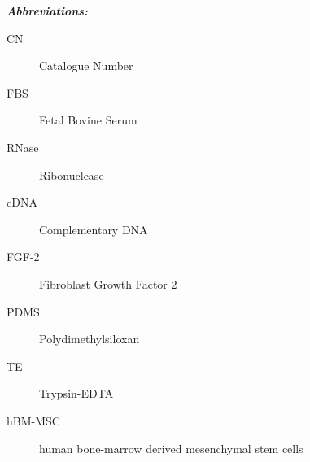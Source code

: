 \textit{\textbf{Abbreviations:}}
\begin{description}
\item[CN] Catalogue Number
\item[FBS] Fetal Bovine Serum
\item[RNase] Ribonuclease
\item[cDNA] Complementary DNA
\item[FGF-2] Fibroblast Growth Factor 2
\item[PDMS] Polydimethylsiloxan
\item[TE] Trypsin-EDTA
\item[hBM-MSC] human bone-marrow derived mesenchymal stem cells 

\end{description}